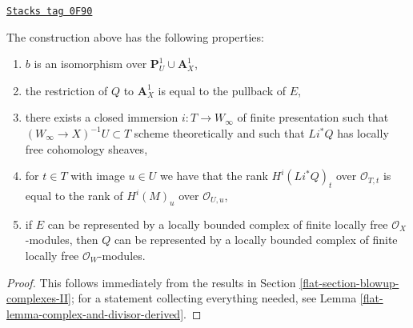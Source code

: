 \begin{lemma}
\label{flat-lemma-graph-construction}
\href{https://stacks.math.columbia.edu/tag/0F90}{\texttt{Stacks tag 0F90}}

The construction above has the following properties:
\begin{enumerate}
\item $b$ is an isomorphism over $\mathbf{P}^1_U \cup \mathbf{A}^1_X$,
\item the restriction of $Q$ to $\mathbf{A}^1_X$
is equal to the pullback of $E$,
\item there exists a closed immersion $i : T \to W_\infty$
of finite presentation such that $(W_\infty \to X)^{-1}U \subset T$
scheme theoretically and such that $Li^*Q$ has locally free cohomology
sheaves,
\item for $t \in T$ with image $u \in U$ we have that the
rank $H^i(Li^*Q)_t$ over $\mathcal{O}_{T, t}$ is equal to the rank
of $H^i(M)_u$ over $\mathcal{O}_{U, u}$,
\item if $E$ can be represented by a locally bounded complex of
finite locally free $\mathcal{O}_X$-modules, then $Q$ can be represented
by a locally bounded complex of finite locally free $\mathcal{O}_W$-modules.
\end{enumerate}
\end{lemma}

\begin{proof}

This follows immediately from the results in
Section \ref{flat-section-blowup-complexes-II}; for a statement
collecting everything needed, see
Lemma \ref{flat-lemma-complex-and-divisor-derived}.
\end{proof}



